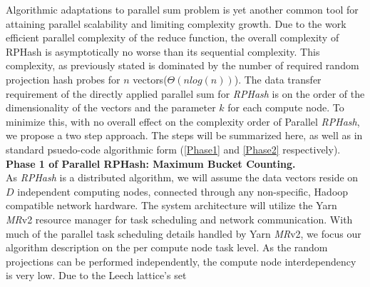 \documentclass[a4paper,10pt]{article}
\begin{document}
Algorithmic adaptations to parallel sum problem is yet another common tool for attaining
parallel scalability and limiting complexity growth.
Due to the work efficient parallel complexity of the reduce function, the overall complexity of RPHash is
asymptotically no worse than its sequential complexity. 
This complexity, as previously stated is dominated by the number of required 
random projection hash probes for $n$ vectors($\Theta(nlog(n))$). 
The data transfer requirement of the
directly applied parallel sum for
\emph{RPHash} is on the order of the dimensionality of the vectors and the
parameter $k$ for each compute
node. To minimize this, with no overall effect on the complexity order of
Parallel \emph{RPHash}, we
propose a two step approach. The steps will be summarized here, as well as in
standard psuedo-code
algorithmic form (\ref{Phase1} and \ref{Phase2} respectively).\\
\textbf{Phase 1 of Parallel RPHash: Maximum Bucket Counting.}\\
As \emph{RPHash} is a distributed algorithm, we will assume the data 
vectors reside on $D$ independent computing nodes, connected through
any non-specific, Hadoop\cite{hadoop} compatible network hardware. The system
architecture
will utilize the Yarn \emph{MR}v2 resource manager for task scheduling
and network communication.  With much of the parallel task scheduling
details handled by Yarn  \emph{MR}v2, we focus our algorithm description on the
per compute node task level.  
As the random projections can be performed independently, the compute 
node interdependency is very low.
Due to the Leech lattice's set
\end{document}
